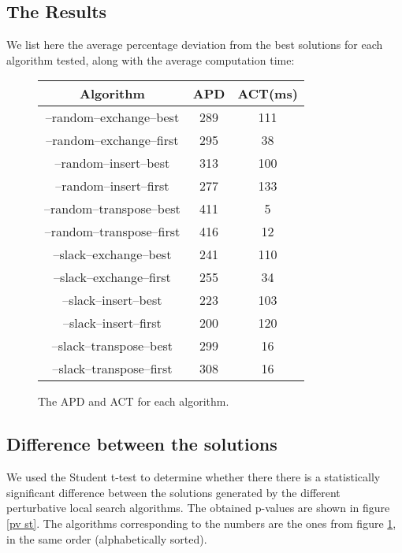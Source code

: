 \subsection{The Results}
We list here the average percentage deviation from the best solutions for each algorithm tested, along with the average computation time:

\begin{figure}[H]
\begin{center}
	\begin{tabular}{|c|c|c|} \hline
		Algorithm & APD & ACT(ms) \\ \hline \hline
		
		--random--exchange--best		& 289	& 111 \\ \hline
		--random--exchange--first	& 295	& 38 \\ \hline
		--random--insert--best		& 313	& 100 \\ \hline
		--random--insert--first		& 277	& 133 \\ \hline
		--random--transpose--best	& 411	& 5 \\ \hline
		--random--transpose--first	& 416	& 12 \\ \hline
		--slack--exchange--best		& 241	& 110 \\ \hline
		--slack--exchange--first		& 255	& 34 \\ \hline
		--slack--insert--best		& 223	& 103 \\ \hline
		--slack--insert--first		& 200	& 120 \\ \hline
		--slack--transpose--best		& 299	& 16 \\ \hline
		--slack--transpose--first	& 308	& 16 \\ \hline
	\end{tabular}
\end{center}
\caption{The APD and ACT for each algorithm.}
\label{al}
\end{figure}

\subsection{Difference between the solutions}
We used the Student t-test to determine whether there there is a statistically significant difference between the solutions generated by the different perturbative local search algorithms. The obtained p-values are shown in figure \ref{pv st}. The algorithms corresponding to the numbers are the ones from figure \ref{al}, in the same order (alphabetically sorted).\\

